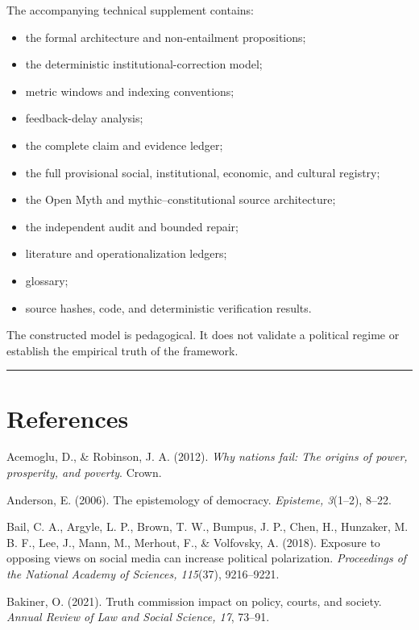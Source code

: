 \documentclass[
  11pt,
]{article}
\providecommand{\tightlist}{%
  \setlength{\itemsep}{0pt}\setlength{\parskip}{0pt}}
\begin{document}
The accompanying technical supplement contains:

\begin{itemize}
\tightlist
\item
  the formal architecture and non-entailment propositions;
\item
  the deterministic institutional-correction model;
\item
  metric windows and indexing conventions;
\item
  feedback-delay analysis;
\item
  the complete claim and evidence ledger;
\item
  the full provisional social, institutional, economic, and cultural
  registry;
\item
  the Open Myth and mythic--constitutional source architecture;
\item
  the independent audit and bounded repair;
\item
  literature and operationalization ledgers;
\item
  glossary;
\item
  source hashes, code, and deterministic verification results.
\end{itemize}

The constructed model is pedagogical. It does not validate a political
regime or establish the empirical truth of the framework.

\begin{center}\rule{0.5\linewidth}{0.5pt}\end{center}

\section{References}\label{references}

Acemoglu, D., \& Robinson, J. A. (2012). \emph{Why nations fail: The
origins of power, prosperity, and poverty}. Crown.

Anderson, E. (2006). The epistemology of democracy. \emph{Episteme,
3}(1--2), 8--22.

Bail, C. A., Argyle, L. P., Brown, T. W., Bumpus, J. P., Chen, H.,
Hunzaker, M. B. F., Lee, J., Mann, M., Merhout, F., \& Volfovsky, A.
(2018). Exposure to opposing views on social media can increase
political polarization. \emph{Proceedings of the National Academy of
Sciences, 115}(37), 9216--9221.

Bakiner, O. (2021). Truth commission impact on policy, courts, and
society. \emph{Annual Review of Law and Social Science, 17}, 73--91.
\end{document}
